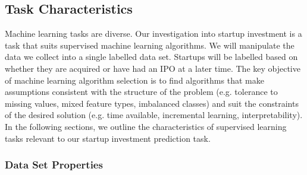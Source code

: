 \documentclass[../thesis/thesis.tex]{subfiles}
\begin{document}
\begin{refsection}

\subsection{Task Characteristics}

Machine learning tasks are diverse. Our investigation into startup investment is a task that suits supervised machine learning algorithms. We will manipulate the data we collect into a single labelled data set. Startups will be labelled based on whether they are acquired or have had an IPO at a later time. The key objective of machine learning algorithm selection is to find algorithms that make assumptions consistent with the structure of the problem (e.g. tolerance to missing values, mixed feature types, imbalanced classes) and suit the constraints of the desired solution (e.g. time available, incremental learning, interpretability). In the following sections, we outline the characteristics of supervised learning tasks relevant to our startup investment prediction task.

\subsubsection{Data Set Properties}


\end{refsection}
\end{document}
